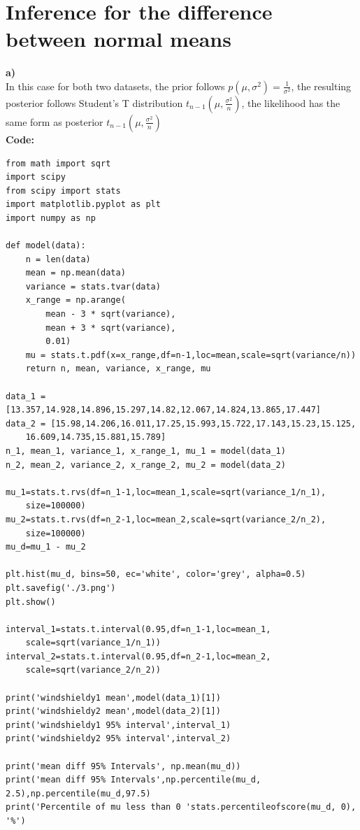 \documentclass{article}
\begin{document}
\section{Inference for the difference between normal means}
\textbf{a)}\\
In this case for both two datasets, the prior follows $p(\mu, \sigma^2)=\frac{1}{\sigma^2}$, the resulting posterior follows Student's T distribution $t_{n-1}(\mu,\frac{\sigma^2}{n})$, the likelihood has the same form as posterior $t_{n-1}(\mu,\frac{\sigma^2}{n})$ \\

\textbf{Code:}
\begin{verbatim}  
from math import sqrt
import scipy
from scipy import stats
import matplotlib.pyplot as plt
import numpy as np

def model(data):
    n = len(data)
    mean = np.mean(data)
    variance = stats.tvar(data)
    x_range = np.arange(
        mean - 3 * sqrt(variance),
        mean + 3 * sqrt(variance),
        0.01)
    mu = stats.t.pdf(x=x_range,df=n-1,loc=mean,scale=sqrt(variance/n))
    return n, mean, variance, x_range, mu

data_1 = [13.357,14.928,14.896,15.297,14.82,12.067,14.824,13.865,17.447]
data_2 = [15.98,14.206,16.011,17.25,15.993,15.722,17.143,15.23,15.125,
	16.609,14.735,15.881,15.789]
n_1, mean_1, variance_1, x_range_1, mu_1 = model(data_1)
n_2, mean_2, variance_2, x_range_2, mu_2 = model(data_2)

mu_1=stats.t.rvs(df=n_1-1,loc=mean_1,scale=sqrt(variance_1/n_1),
	size=100000)
mu_2=stats.t.rvs(df=n_2-1,loc=mean_2,scale=sqrt(variance_2/n_2),
	size=100000)
mu_d=mu_1 - mu_2

plt.hist(mu_d, bins=50, ec='white', color='grey', alpha=0.5)
plt.savefig('./3.png')
plt.show()

interval_1=stats.t.interval(0.95,df=n_1-1,loc=mean_1,
	scale=sqrt(variance_1/n_1))
interval_2=stats.t.interval(0.95,df=n_2-1,loc=mean_2,
	scale=sqrt(variance_2/n_2))

print('windshieldy1 mean',model(data_1)[1])
print('windshieldy2 mean',model(data_2)[1])
print('windshieldy1 95% interval',interval_1)
print('windshieldy2 95% interval',interval_2)

print('mean diff 95% Intervals', np.mean(mu_d))
print('mean diff 95% Intervals',np.percentile(mu_d, 2.5),np.percentile(mu_d,97.5)
print('Percentile of mu less than 0 'stats.percentileofscore(mu_d, 0), '%')
\end{verbatim}
\end{document}

